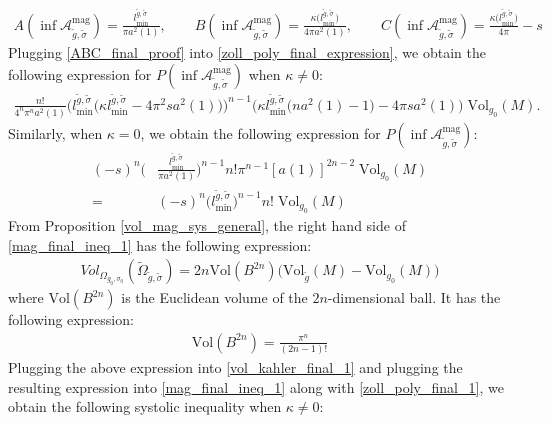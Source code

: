 \documentclass[11pt]{amsart}
\theoremstyle{plain}
\theoremstyle{definition}
\theoremstyle{remark}
\begin{document}
 \begin{align}\label{ABC_final_proof}
     A(\inf \mathcal{A}^{\text{mag}}_{\tilde g,\tilde \sigma}) = \frac{l_{\text{min}}^{\tilde g,\tilde \sigma}}{\pi a^2(1)}, \qquad B(\inf \mathcal{A}^{\text{mag}}_{\tilde g,\tilde \sigma})= \frac{\kappa\big(l_{\text{min}}^{\tilde g,\tilde \sigma}\bigr)}{4\pi a^2(1)},\qquad C(\inf \mathcal{A}^{\text{mag}}_{\tilde g,\tilde \sigma})= \frac{\kappa\big(l_{\text{min}}^{\tilde g,\tilde \sigma}\bigr)}{4\pi} -s
 \end{align}
Plugging \eqref{ABC_final_proof} into \eqref{zoll_poly_final_expression}, we obtain the following expression for $P(\inf \mathcal{A}^{\text{mag}}_{\tilde g,\tilde \sigma})$ when $\kappa \neq 0$:
\begin{align}\label{zoll_poly_final_1}
    \frac{n!}{4^n\pi^n a^2(1)}
    \Bigg(
        l_{\text{min}}^{\tilde g,\tilde \sigma}
        \Big(
            \kappa l_{\text{min}}^{\tilde g,\tilde \sigma}
            -4\pi^2s a^2(1)
        \Big)
    \Bigg)^{n-1}
    \Bigg(
        \kappa l_{\text{min}}^{\tilde g,\tilde \sigma}
        \big(na^2(1)-1\big)
        -4\pi s a^2(1)
    \Bigg)
    \;\text{Vol}_{g_0}(M).
\end{align}
Similarly, when $\kappa =0$, we obtain the following expression for $P(\inf \mathcal{A}^{\text{mag}}_{\tilde g,\tilde \sigma})$:
\begin{align}
    (-s)^n \Bigg(&\frac{l_{\text{min}}^{\tilde g,\tilde \sigma}}{\pi a^2(1)} \Bigg)^{n-1}n!\pi^{n-1}[a(1)]^{2n-2}
    \;\text{Vol}_{g_0}(M) \\\nonumber = &(-s)^n \Big(l_{\text{min}}^{\tilde g,\tilde \sigma}\Big)^{n-1}n!
    \;\text{Vol}_{g_0}(M)
\end{align}
From Proposition \ref{vol_mag_sys_general}, the right hand side of \eqref{mag_final_ineq_1} has the following expression:
\begin{align}\label{vol_kahler_final_1}
Vol_{\Omega_{g_0,\sigma_0}}(\tilde \Omega_{\tilde g, \tilde \sigma}) =     2n\text{Vol}(B^{2n}) \Big( \text{Vol}_{\tilde g}(M) - \text{Vol}_{g_0}(M) \Big)
\end{align}
where $\text{Vol}(B^{2n})$ is the Euclidean volume of the $2n$-dimensional ball. It has the following expression:
\begin{align}
    \text{Vol}(B^{2n})
=
\frac{\pi^{n}}{(2n-1)!}
\end{align}
Plugging the above expression into \eqref{vol_kahler_final_1} and plugging the resulting expression into \eqref{mag_final_ineq_1} along with \eqref{zoll_poly_final_1}, we obtain the following systolic inequality when $\kappa \neq 0$:
\end{document}
